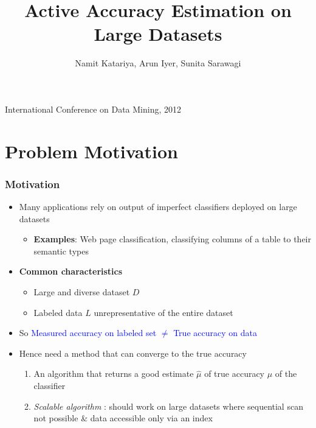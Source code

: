 \documentclass[11pt]{beamer}
\title[]{Active Accuracy Estimation on Large Datasets}
\author {Namit Katariya, Arun Iyer, Sunita Sarawagi}
\institute{IIT Bombay}
\date{}
\newlength{\wideitemsep}
\let\olditem\item
\renewcommand{\item}{\setlength{\itemsep}{\wideitemsep}\olditem}
\begin{document}
\begin{frame}
\titlepage
\begin{center}
\large{International Conference on Data Mining, 2012} \\ \vspace*{10pt}
\end{center}
\end{frame}




\section{Problem Motivation}
\begin{frame}
\frametitle{Motivation}
\pause
\begin{itemize}
\item Many applications rely on output of imperfect classifiers deployed on large datasets \\ 
\begin{itemize}
\item[] \textbf{Examples}: Web page classification, classifying columns of a table to their semantic types
\end{itemize}
\pause
\item \textbf{Common characteristics} 
\begin{itemize}
\item Large and diverse dataset $D$
\item Labeled data $L$ unrepresentative of the entire dataset
\end{itemize}
\pause
\item So \textcolor{blue}{Measured accuracy on labeled set $\neq$ True accuracy on data}
\pause
\item Hence need a method that can converge to the true accuracy
\begin{enumerate}
\item An algorithm that returns a good estimate $\hat{\mu}$ of true accuracy $\mu$ of the classifier
\item \textit{Scalable algorithm} : should work on large datasets where sequential scan not possible \& data accessible only via an index
\end{enumerate} 
\end{itemize}
\end{frame}
\end{document}
